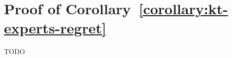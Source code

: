 \section{Proof of Corollary~\ref{corollary:kt-experts-regret}}
\label{section:kt-experts-proof}

TODO
